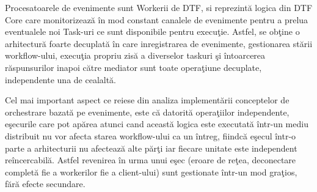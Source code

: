 \par Procesatoarele de evenimente sunt Workerii de DTF, si reprezintă logica din DTF Core care monitorizează în mod constant canalele de evenimente pentru a prelua eventualele noi Task-uri ce sunt disponibile pentru execuţie. Astfel, se obţine o arhitectură foarte decuplată în care inregistrarea de evenimente, gestionarea stării workflow-ului, execuţia propriu zisă a diverselor taskuri şi întoarcerea răspunsurilor inapoi către mediator sunt toate operaţiune decuplate, independente una de cealaltă.
\par Cel mai important aspect ce reiese din analiza implementării conceptelor de orchestrare bazată pe evenimente, este că datorită operaţiilor independente, eşecurile care pot apărea atunci cand această logica este executată într-un mediu distribuit nu vor afecta starea workflow-ului ca un întreg, fiindcă eşecul într-o parte a arhitecturii nu afectează alte părţi iar fiecare unitate este independent reîncercabilă. Astfel revenirea în urma unui eşec (eroare de reţea, deconectare completă fie a workerilor fie a client-ului) sunt gestionate într-un mod graţios, fără efecte secundare. 

